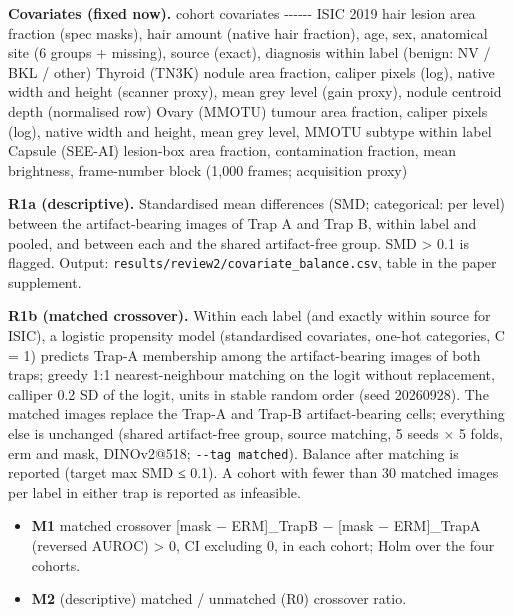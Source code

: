 {\textbf{Covariates (fixed now).}
\textbar{} cohort \textbar{} covariates \textbar{}
\textbar-\/-\/-\textbar-\/-\/-\textbar{}
\textbar{} ISIC 2019 hair \textbar{} lesion area fraction (spec masks), hair amount (native hair fraction), age, sex, anatomical site (6 groups + missing), source (exact), diagnosis within label (benign: NV / BKL / other) \textbar{}
\textbar{} Thyroid (TN3K) \textbar{} nodule area fraction, caliper pixels (log), native width and height (scanner proxy), mean grey level (gain proxy), nodule centroid depth (normalised row) \textbar{}
\textbar{} Ovary (MMOTU) \textbar{} tumour area fraction, caliper pixels (log), native width and height, mean grey level, MMOTU subtype within label \textbar{}
\textbar{} Capsule (SEE-AI) \textbar{} lesion-box area fraction, contamination fraction, mean brightness, frame-number block (1,000 frames; acquisition proxy) \textbar{}

\textbf{R1a (descriptive).} Standardised mean differences (SMD; categorical: per level) between the artifact-bearing
images of Trap A and Trap B, within label and pooled, and between each and the shared artifact-free group.
\textbar SMD\textbar{} \textgreater{} 0.1 is flagged. Output: \texttt{results/review2/covariate\_balance.csv}, table in the paper supplement.

\textbf{R1b (matched crossover).} Within each label (and exactly within source for ISIC), a logistic propensity model
(standardised covariates, one-hot categories, C = 1) predicts Trap-A membership among the artifact-bearing images of
both traps; greedy 1:1 nearest-neighbour matching on the logit without replacement, calliper 0.2 SD of the logit,
units in stable random order (seed 20260928). The matched images replace the Trap-A and Trap-B artifact-bearing
cells; everything else is unchanged (shared artifact-free group, source matching, 5 seeds × 5 folds, erm and mask,
DINOv2@518; \texttt{-\/-tag\ matched}). Balance after matching is reported (target max \textbar SMD\textbar{} ≤ 0.1). A cohort with fewer than
30 matched images per label in either trap is reported as infeasible.

\begin{itemize}

\item
  \textbf{M1} matched crossover {[}mask − ERM{]}\_TrapB − {[}mask − ERM{]}\_TrapA (reversed AUROC) \textgreater{} 0, CI excluding 0, in each
  cohort; Holm over the four cohorts.
\item
  \textbf{M2} (descriptive) matched / unmatched (R0) crossover ratio.
\end{itemize}

}
